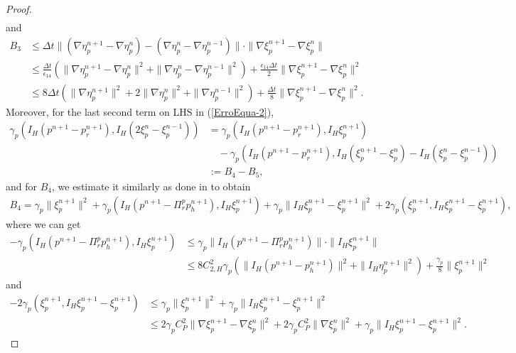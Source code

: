 \documentclass[10pt,twoside,openany,UTF8,CJK]{article}
\begin{document}
\begin{proof}
$$\begin{aligned}
	\end{aligned}
    $$
    and
    $$
    \begin{aligned}	
		B_3 &\leq \Delta t\|(\nabla\eta^{n+1}_p - \nabla\eta^{n}_p) - (\nabla\eta^{n}_p - \nabla\eta^{n-1}_p)\|\cdot\|\nabla \xi^{n+1}_p - \nabla\xi^{n}_p\| \\
		&\leq \frac{\Delta t}{\epsilon_{14}}\left(\|\nabla\eta^{n+1}_p - \nabla\eta^{n}_p\|^2 + \|\nabla\eta^{n}_p - \nabla\eta^{n-1}_p\|^2\right) + \frac{\epsilon_{14}\Delta t}{2}\|\nabla \xi^{n+1}_p - \nabla\xi^{n}_p\|^2 \\
		&\leq 8\Delta t\left(\|\nabla\eta^{n+1}_p\|^2 + 2\|\nabla\eta^{n}_p\|^2 + \|\nabla\eta^{n-1}_p\|^2\right) + \frac{\Delta t}{8}\|\nabla \xi^{n+1}_p - \nabla\xi^{n}_p\|^2.
    \end{aligned}
    $$	
	Moreover, for the last second term on LHS in (\ref{ErroEqua-2}),
	$$
	\begin{aligned}
		\gamma_p(I_H(p^{n+1} - p^{n+1}_r), I_H(2\xi^n_p-\xi^{n-1}_p))	&= \gamma_p(I_H(p^{n+1} - p^{n+1}_r), I_H\xi^{n+1}_p) \\
		&\quad- \gamma_p(I_H(p^{n+1} - p^{n+1}_r), I_H(\xi^{n+1}_p-\xi^{n}_p) - I_H(\xi^n_p-\xi^{n-1}_p)) \\
		&:= B_4 - B_5,
	\end{aligned}
    $$	
	and for $B_4$, we estimate it similarly as done in \cite{CDA-2019-CMAME} to obtain
	$$
	\begin{aligned}
		B_4 = \gamma_p\|\xi^{n+1}_p\|^2 + \gamma_p(I_H(p^{n+1} - \Pi^p_rp^{n+1}_h), I_H\xi^{n+1}_p) + \gamma_p\|I_H\xi^{n+1}_p - \xi^{n+1}_p\|^2 + 2\gamma_p(\xi^{n+1}_p, I_H\xi^{n+1}_p - \xi^{n+1}_p),
	\end{aligned}
	$$	
	where we can get
	$$
	\begin{aligned}
		-\gamma_p(I_H(p^{n+1} - \Pi^p_rp^{n+1}_h), I_H\xi^{n+1}_p) &\leq \gamma_p\|I_H(p^{n+1} - \Pi^p_rp^{n+1}_h)\|\cdot\|I_H\xi^{n+1}_p\| \\
		&\leq 8C^2_{2,H}\gamma_p\left(\|I_H(p^{n+1} - p^{n+1}_h)\|^2 + \|I_H\eta^{n+1}_p\|^2\right) + \frac{\gamma_p}{8}\|\xi^{n+1}_p\|^2
	\end{aligned}
    $$
    and
    $$
    \begin{aligned}
    	-2\gamma_p(\xi^{n+1}_p, I_H\xi^{n+1}_p - \xi^{n+1}_p) &\leq \gamma_p\|\xi^{n+1}_p\|^2 + \gamma_p\|I_H\xi^{n+1}_p - \xi^{n+1}_p\|^2 \\
    	&\leq 2\gamma_p C^2_{P}\|\nabla\xi^{n+1}_p - \nabla\xi^{n}_p\|^2 + 2\gamma_p C^2_{P}\|\nabla\xi^{n}_p\|^2 + \gamma_p\|I_H\xi^{n+1}_p - \xi^{n+1}_p\|^2.

\end{aligned}$$
\end{proof}
\end{document}
